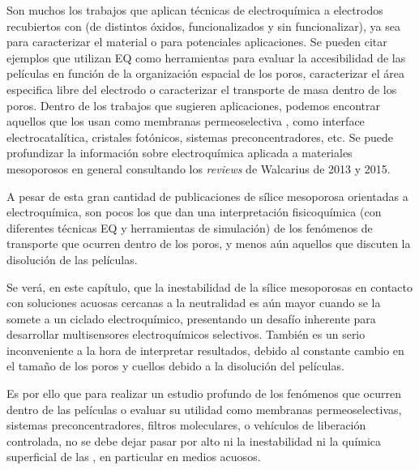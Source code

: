 
	Son muchos los trabajos que aplican técnicas de electroquímica a electrodos recubiertos con \pdm\space (de distintos óxidos, funcionalizados y sin funcionalizar), ya sea para caracterizar el material o para potenciales aplicaciones. Se pueden citar ejemplos que utilizan EQ como herramientas para evaluar la accesibilidad de las películas en función de la organización espacial de los poros\cite{Etienne2007,Herzog2013,karman2016}, caracterizar el área especifica libre del electrodo \cite{Otal2006} o caracterizar el transporte de masa dentro de los poros\cite{Calvo2009,brunsen2011}. Dentro de los trabajos que sugieren aplicaciones, podemos encontrar aquellos que los usan como membranas permeoselectiva \cite{Fattakhova-Rohlfing2007,Andrieu-Brunsen2015,Calvo2009,nasir2018}, como interface electrocatalítica\cite{BaeJ.HanJ.Chung2012}, cristales fotónicos\cite{Gimenez2017}, sistemas preconcentradores\cite{Etienne2015,Gimenez2016-2}, etc. Se puede profundizar la información sobre electroquímica aplicada a materiales mesoporosos en general consultando los \textit{reviews} de Walcarius de 2013\cite{walcarius2013,Etienne2013} y 2015\cite{Etienne2015}.

	A pesar de esta gran cantidad de publicaciones de sílice mesoporosa orientadas a electroquímica, son pocos los que dan una interpretación fisicoquímica (con diferentes técnicas EQ y herramientas de simulación) de los fenómenos de transporte que ocurren dentro de los poros, y menos aún aquellos que discuten la disolución de las películas. 

	Se verá, en este capítulo, que la inestabilidad de la sílice mesoporosas en contacto con soluciones acuosas cercanas a la neutralidad es aún mayor cuando se la somete a un ciclado electroquímico, presentando un desafío inherente para desarrollar multisensores electroquímicos selectivos. También es un serio inconveniente a la hora de interpretar resultados, debido al constante cambio en el tamaño de los poros y cuellos debido a la disolución del películas. 

	Es por ello que para realizar un estudio profundo de los fenómenos que ocurren dentro de las películas o evaluar su utilidad como membranas permeoselectivas, sistemas preconcentradores, filtros moleculares, o vehículos de liberación controlada, no se debe dejar pasar por alto ni la inestabilidad ni la química superficial de las \pdm, en particular en medios acuosos. 
	

